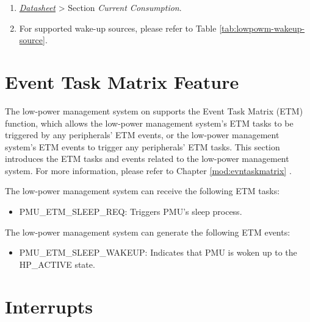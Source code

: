 \documentclass[main\_\_EN.tex]{subfiles}
\begin{document}
\begin{tiplisting}
\vspace{-2em}
\label{other:lowpowm-predefined-modes-notes}
\begin{enumerate}
    \item \textit{\href{https://www.espressif.com/sites/default/files/documentation/esp32-c61_datasheet_cn.pdf}{\chipname{} Datasheet}} > Section \textit{Current Consumption}.
    \item For supported wake-up sources, please refer to Table \ref{tab:lowpowm-wakeup-source}.
\end{enumerate}
\end{tiplisting}


\section{Event Task Matrix Feature}
\label{sec:lowpowm-etm-func}

The low-power management system on \chipname{} supports the Event Task Matrix (ETM) function, which allows the low-power management system's ETM tasks to be triggered by any peripherals' ETM events, or the low-power management system's ETM events to trigger any peripherals' ETM tasks. This section introduces the ETM tasks and events related to the low-power management system. For more information, please refer to Chapter \ref{mod:evntaskmatrix} .

The low-power management system can receive the following ETM tasks:

\begin{itemize}
\item PMU\_ETM\_SLEEP\_REQ: Triggers PMU's sleep process.
\end{itemize}

The low-power management system can generate the following ETM events:

\begin{itemize}
\item PMU\_ETM\_SLEEP\_WAKEUP: Indicates that PMU is woken up to the HP\_ACTIVE state.
\end{itemize}


\section{Interrupts}
\end{document}
